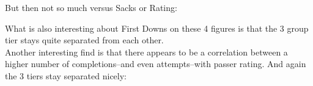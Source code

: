 \documentclass[10pt]{article}
\begin{document}
\par
But then not so much versus Sacks or Rating:
\par
{}%
\hfill
{}%
\par
What is also interesting about First Downs on these 4 figures is that the 3 group tier stays quite separated from each other.\\
Another interesting find is that there appears to be a correlation between a higher number of completions--and even attempts--with passer rating. And again the 3 tiers stay separated nicely:
\par
{}%
\hfill
{}%
\end{document}
